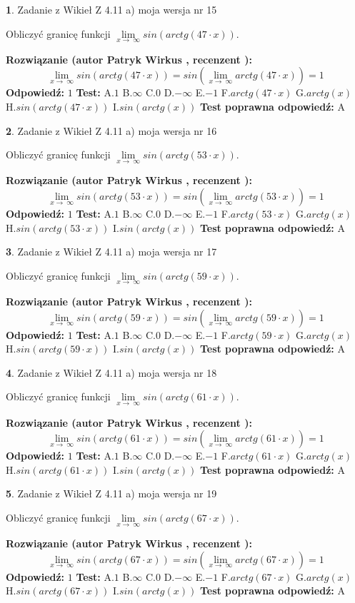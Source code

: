 \documentclass[12pt, a4paper]{article}
\theoremstyle{definition} %
\newtheorem{zad}{}
\newcommand{\zadStart}[1]{\begin{zad}#1\newline}
\newcommand{\zadStop}{\end{zad}}
\newcommand{\rozwStart}[2]{\noindent \textbf{Rozwiązanie (autor #1 , recenzent #2): }\newline}
\newcommand{\rozwStop}{\newline}
\newcommand{\odpStart}{\noindent \textbf{Odpowiedź:}\newline}
\newcommand{\odpStop}{\newline}
\newcommand{\testStart}{\noindent \textbf{Test:}\newline}
\newcommand{\testStop}{\newline}
\newcommand{\kluczStart}{\noindent \textbf{Test poprawna odpowiedź:}\newline}
\newcommand{\kluczStop}{\newline}
\begin{document}
\zadStart{Zadanie z Wikieł Z 4.11 a) moja wersja nr 15}

Obliczyć granicę funkcji  $\lim\limits_{x\to\ \infty}sin(arctg(47\cdot x))$.
\zadStop
\rozwStart{Patryk Wirkus}{}
$$\lim\limits_{x\to\ \infty}sin(arctg(47\cdot x)) = sin(\lim\limits_{x\to\ \infty}arctg(47\cdot x)) = 1$$
\rozwStop
\odpStart
$1$
\odpStop
\testStart
A.$1$ B.$\infty$ C.$0$ D.$-\infty$ E.$-1$
F.$arctg(47\cdot x)$ G.$arctg(x)$
H.$sin(arctg(47\cdot x))$
I.$sin(arctg(x))$
\testStop
\kluczStart
A
\kluczStop



\zadStart{Zadanie z Wikieł Z 4.11 a) moja wersja nr 16}

Obliczyć granicę funkcji  $\lim\limits_{x\to\ \infty}sin(arctg(53\cdot x))$.
\zadStop
\rozwStart{Patryk Wirkus}{}
$$\lim\limits_{x\to\ \infty}sin(arctg(53\cdot x)) = sin(\lim\limits_{x\to\ \infty}arctg(53\cdot x)) = 1$$
\rozwStop
\odpStart
$1$
\odpStop
\testStart
A.$1$ B.$\infty$ C.$0$ D.$-\infty$ E.$-1$
F.$arctg(53\cdot x)$ G.$arctg(x)$
H.$sin(arctg(53\cdot x))$
I.$sin(arctg(x))$
\testStop
\kluczStart
A
\kluczStop



\zadStart{Zadanie z Wikieł Z 4.11 a) moja wersja nr 17}

Obliczyć granicę funkcji  $\lim\limits_{x\to\ \infty}sin(arctg(59\cdot x))$.
\zadStop
\rozwStart{Patryk Wirkus}{}
$$\lim\limits_{x\to\ \infty}sin(arctg(59\cdot x)) = sin(\lim\limits_{x\to\ \infty}arctg(59\cdot x)) = 1$$
\rozwStop
\odpStart
$1$
\odpStop
\testStart
A.$1$ B.$\infty$ C.$0$ D.$-\infty$ E.$-1$
F.$arctg(59\cdot x)$ G.$arctg(x)$
H.$sin(arctg(59\cdot x))$
I.$sin(arctg(x))$
\testStop
\kluczStart
A
\kluczStop



\zadStart{Zadanie z Wikieł Z 4.11 a) moja wersja nr 18}

Obliczyć granicę funkcji  $\lim\limits_{x\to\ \infty}sin(arctg(61\cdot x))$.
\zadStop
\rozwStart{Patryk Wirkus}{}
$$\lim\limits_{x\to\ \infty}sin(arctg(61\cdot x)) = sin(\lim\limits_{x\to\ \infty}arctg(61\cdot x)) = 1$$
\rozwStop
\odpStart
$1$
\odpStop
\testStart
A.$1$ B.$\infty$ C.$0$ D.$-\infty$ E.$-1$
F.$arctg(61\cdot x)$ G.$arctg(x)$
H.$sin(arctg(61\cdot x))$
I.$sin(arctg(x))$
\testStop
\kluczStart
A
\kluczStop



\zadStart{Zadanie z Wikieł Z 4.11 a) moja wersja nr 19}

Obliczyć granicę funkcji  $\lim\limits_{x\to\ \infty}sin(arctg(67\cdot x))$.
\zadStop
\rozwStart{Patryk Wirkus}{}
$$\lim\limits_{x\to\ \infty}sin(arctg(67\cdot x)) = sin(\lim\limits_{x\to\ \infty}arctg(67\cdot x)) = 1$$
\rozwStop
\odpStart
$1$
\odpStop
\testStart
A.$1$ B.$\infty$ C.$0$ D.$-\infty$ E.$-1$
F.$arctg(67\cdot x)$ G.$arctg(x)$
H.$sin(arctg(67\cdot x))$
I.$sin(arctg(x))$
\testStop
\kluczStart
A
\kluczStop
\end{document}
